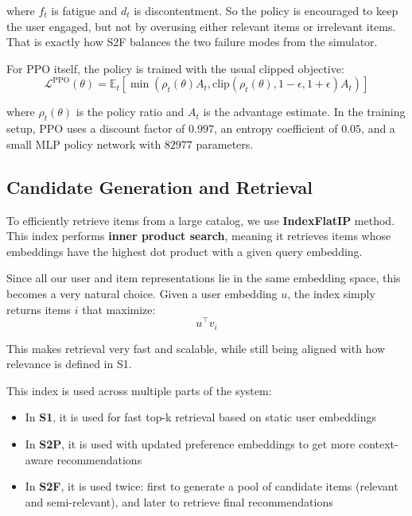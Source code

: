 where $f_t$ is fatigue and $d_t$ is discontentment. 
So the policy is encouraged to keep the user engaged, but not by overusing either relevant items or irrelevant items. 
That is exactly how S2F balances the two failure modes from the simulator.

For PPO itself, the policy is trained with the usual clipped objective:
\begin{equation}
    \mathcal{L}^{\text{PPO}}(\theta) =
        \mathbb{E}_t \left[
            \min\left(
                \rho_t(\theta) A_t,
                \text{clip}(\rho_t(\theta), 1-\epsilon, 1+\epsilon) A_t
            \right)
        \right]
\end{equation}

where $\rho_t(\theta)$ is the policy ratio and $A_t$ is the advantage estimate. 
In the training setup, PPO uses a discount factor of $0.997$, an entropy coefficient of $0.05$, and a small MLP policy network with $82977$ parameters.



\subsection{Candidate Generation and Retrieval}

To efficiently retrieve items from a large catalog, we use \textbf{IndexFlatIP} method. 
This index performs \textbf{inner product search}, meaning it retrieves items whose embeddings have the highest dot product with a given query embedding.

Since all our user and item representations lie in the same embedding space, this becomes a very natural choice. 
Given a user embedding $u$, the index simply returns items $i$ that maximize:
\begin{equation}
    u^\top v_i
\end{equation}

This makes retrieval very fast and scalable, while still being aligned with how relevance is defined in S1.

This index is used across multiple parts of the system:

\begin{itemize}
    \item In \textbf{S1}, it is used for fast top-k retrieval based on static user embeddings
    \item In \textbf{S2P}, it is used with updated preference embeddings to get more context-aware recommendations
    \item In \textbf{S2F}, it is used twice: first to generate a pool of candidate items (relevant and semi-relevant), and later to retrieve final recommendations
\end{itemize}


